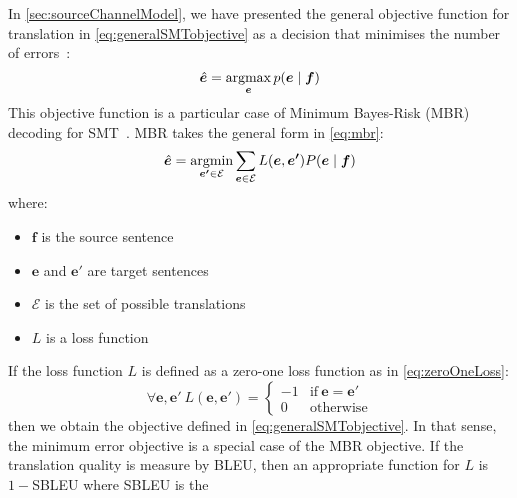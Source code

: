 
In \autoref{sec:sourceChannelModel}, we have presented the general
objective function for translation in \autoref{eq:generalSMTobjective}
as a decision that
minimises the number of
errors~\citep[p.~39-40]{bishop:2006:book}:
%
\begin{equation}
  \hat{\bm{e}} = \operatorname*{argmax}_{\bm{e}} p(\bm{e} \mid \bm{f})
  \label{eq:generalSMTobjective}
\end{equation}
%
This objective function is a particular case of
Minimum Bayes-Risk (MBR) decoding for SMT~\citep{kumar-byrne:2004:NAACL}.
MBR takes the general form in \autoref{eq:mbr}:
%
\begin{equation} \label{eq:mbr}
  \hat{\bm{e}} = \operatorname*{argmin}_{\bm{e'} \in \mathcal{E}} \sum_{\bm{e} \in \mathcal{E}} L(\bm{e},\bm{e'}) P(\bm{e} \mid \bm{f})
\end{equation}
%
where:
%
\begin{itemize}
  \item $\bm{f}$ is the source sentence
  \item $\bm{e}$ and $\bm{e'}$ are target sentences
  \item $\mathcal{E}$ is the set of possible translations
  \item $L$ is a loss function
\end{itemize}
%
If the loss function $L$ is defined as a zero-one loss function as
in \autoref{eq:zeroOneLoss}:
%
\begin{equation}
\forall \bm{e}, \bm{e'} \ L(\bm{e}, \bm{e'}) =
\begin{cases}
  -1 & \text{if}\ \bm{e} = \bm{e'} \\
  0  & \text{otherwise}
\end{cases}
\label{eq:zeroOneLoss}
\end{equation}
%
then we obtain the objective defined in \autoref{eq:generalSMTobjective}.
In that sense, the minimum error objective is a special case of the
MBR objective.
If the translation quality is measure by
BLEU, then an appropriate function for $L$ is $1 - $SBLEU where SBLEU is the %
